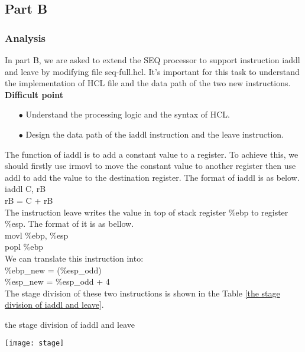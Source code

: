 \documentclass{article}
\begin{document}
\newpage
\subsection{Part B}

\subsubsection{Analysis}

In part B, we are asked to extend the SEQ processor to support instruction  {\ttfamily iaddl} and  {\ttfamily leave} by modifying file  {\ttfamily seq-full.hcl}. It’s important for this task to understand the implementation of HCL file and the data path of the two new instructions.\\

{\normalsize\bfseries Difficult point}
\begin{itemize}
\item[$\bullet$]Understand the processing logic and the syntax of HCL. 
\item[$\bullet$]Design the data path of the  {\ttfamily iaddl} instruction and the  {\ttfamily leave} instruction.
\end{itemize}
\noindent
The function of  {\ttfamily iaddl} is to add a constant value to a register. To achieve this, we should firstly use  {\ttfamily irmovl} to move the constant value to another register then use  {\ttfamily addl} to add the value to the destination register. The format of  {\ttfamily iaddl} is as below.\\
{\ttfamily iaddl C, rB\\rB = C + rB}\\
The instruction leave writes the value in top of stack register {\ttfamily \%ebp} to register {\ttfamily \%esp}. The format of it is as bellow. \\
{\ttfamily movl \%ebp, \%esp\\popl \%ebp}\\
We can translate this instruction into:\\
{\ttfamily \%ebp\_new = (\%esp\_odd)\\\%esp\_new = \%esp\_odd + 4}\\
The stage division of these two instructions is shown in the Table \ref{the stage division of iaddl and leave}.\\
\begin{table}[htbp]
\centering
\caption{the stage division of {\ttfamily iaddl} and {\ttfamily leave}}\label{the stage division of iaddl and leave}%
\texttt{[image: stage]}
\end{table}
\end{document}
